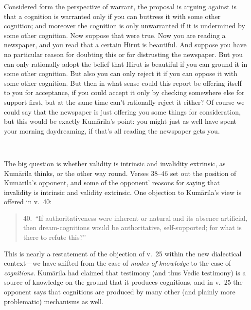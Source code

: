 ﻿\documentclass[11pt]{amsart}
\begin{document}

Considered form the perspective of warrant, the proposal is arguing against is that a cognition is warranted only if you can buttress it with some other cognition; and moreover the cognition is only unwarranted if it is undermined by some other cognition. Now suppose that were true. Now you are reading a newspaper, and you read that a certain Hirut is beautiful. And suppose you have no particular reason for doubting this or for distrusting the newspaper. But you can only rationally adopt the belief that Hirut is beautiful if you can ground it in some other cognition. But also you can only reject it if you can oppose it with some other cognition. But then in what sense could this report be offering itself to you for acceptance, if you could accept it only by checking somewhere else for support first, but at the same time can't rationally reject it either? Of course we could say that the newspaper is just offering you some things for consideration, but this would be exactly Kum\=arila's point: you might just as well have spent your morning daydreaming, if that's all reading the newspaper gets you.%

\

The big question is whether validity is intrinsic and invalidity extrinsic, as Kum\=arila thinks, or the other way round. Verses 38--46 set out the position of Kum\=arila's opponent, and some of the opponent' reasons for saying that invalidity is intrinsic and validity extrinsic. One objection to Kum\=arila's view is offered in v.~40:\small \begin{quote}40.~``If authoritativeness were inherent or natural and its absence artificial, then dream-cognitions would be authoritative, self-supported; for what is there to refute this?''\end{quote}\normalsize This is nearly a restatement of the objection of v.~25 within the new dialectical context---we have shifted from the case of \emph{modes of knowledge} to the case of \emph{cognitions}. Kum\=arila had claimed that testimony (and thus Vedic testimony) is a source of knowledge on the ground that it produces cognitions, and in v.~25 the opponent says that cognitions are produced by many other (and plainly more problematic) mechanisms as well.%
\end{document}
